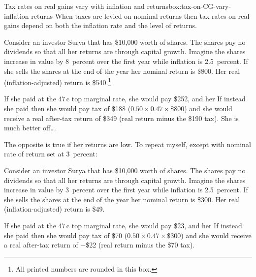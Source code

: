 \documentclass{grattan}\usepackage[]{graphicx}\usepackage[]{color}
\begin{document}
\begin{smallbox}{Tax rates on real gains vary with inflation and returns}{box:tax-on-CG-vary-inflation-returns}
When taxes are levied on nominal returns then tax rates on real gains depend on both the inflation rate and the level of returns. 



Consider an investor Surya that has \$10,000 worth of shares. The shares pay no dividends so that all her returns are through capital growth.
Imagine the shares increase in value by 8~percent over the first year while inflation is 2.5~percent. If she sells the shares at the end of the year her nominal return is \$800. Her real (inflation-adjusted) return is \$540.\footnote{All printed numbers are rounded in this box.}

If she paid  at the 47\,c top marginal rate, she would pay \$252, and her  If instead she paid  then she would pay tax of \$188 ($0.50 \times 0.47 \times \$800$) and she would receive a real after-tax return of \$349 (real return minus the \$190 tax). She is much better off\dots.



The opposite is true if her returns are low. To repeat myself, except with nominal rate of return set at 3~percent:

Consider an investor Surya that has \$10,000 worth of shares. The shares pay no dividends so that all her returns are through capital growth.
Imagine the shares increase in value by 3~percent over the first year while inflation is 2.5~percent. If she sells the shares at the end of the year her nominal return is \$300. Her real (inflation-adjusted) return is \$49.

If she paid  at the 47\,c top marginal rate, she would pay \$23, and her  If instead she paid  then she would pay tax of \$70 ($0.50 \times 0.47 \times \$300$) and she would receive a real after-tax return of $-$\$22 (real return minus the \$70 tax).

\end{smallbox}
\end{document}
